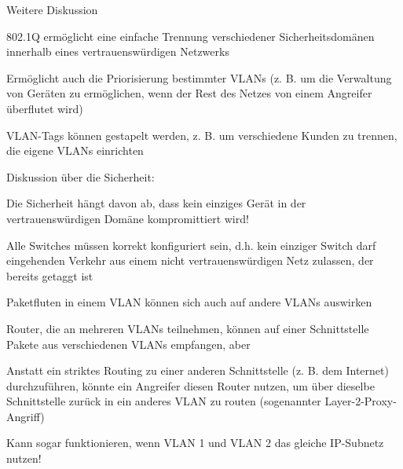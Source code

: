 \documentclass[a4paper]{article}
\begin{document}
\begin{multicols}{3}
      Weitere Diskussion
      \begin{itemize*}
            \item 802.1Q ermöglicht eine einfache Trennung verschiedener Sicherheitsdomänen innerhalb eines vertrauenswürdigen Netzwerks
            \begin{itemize*}
                  \item Ermöglicht auch die Priorisierung bestimmter VLANs (z. B. um die Verwaltung von Geräten zu ermöglichen, wenn der Rest des Netzes von einem Angreifer überflutet wird)
                  \item VLAN-Tags können gestapelt werden, z. B. um verschiedene Kunden zu trennen, die eigene VLANs einrichten
            \end{itemize*}
            \item Diskussion über die Sicherheit:
            \begin{itemize*}
                  \item Die Sicherheit hängt davon ab, dass kein einziges Gerät in der vertrauenswürdigen Domäne kompromittiert wird!
                  \item Alle Switches müssen korrekt konfiguriert sein, d.h. kein einziger Switch darf eingehenden Verkehr aus einem nicht vertrauenswürdigen Netz zulassen, der bereits getaggt ist
                  \item Paketfluten in einem VLAN können sich auch auf andere VLANs auswirken
                  \item Router, die an mehreren VLANs teilnehmen, können auf einer Schnittstelle Pakete aus verschiedenen VLANs empfangen, aber
                  \item Anstatt ein striktes Routing zu einer anderen Schnittstelle (z. B. dem Internet) durchzuführen, könnte ein Angreifer diesen Router nutzen, um über dieselbe Schnittstelle zurück in ein anderes VLAN zu routen (sogenannter Layer-2-Proxy-Angriff)
                  \item Kann sogar funktionieren, wenn VLAN 1 und VLAN 2 das gleiche IP-Subnetz nutzen!
            \end{itemize*}
      \end{itemize*}


\end{multicols}
\end{document}
